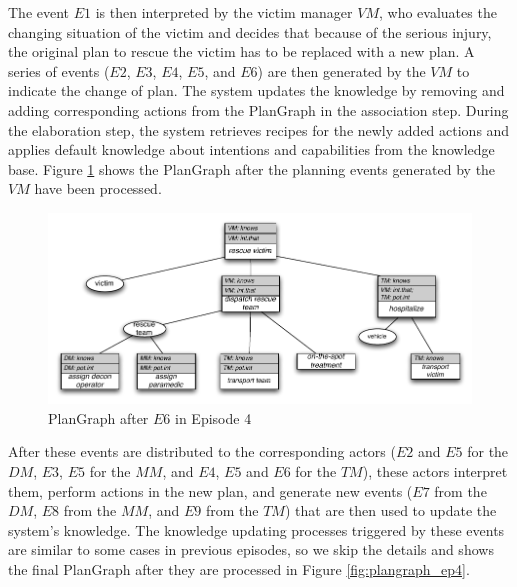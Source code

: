 The event $E1$ is then interpreted by the victim manager $VM$, who evaluates the changing situation of the victim and decides that because of the serious injury, the original plan to rescue the victim has to be replaced with a new plan. A series of events ($E2$, $E3$, $E4$, $E5$, and $E6$) are then generated by the $VM$ to indicate the change of plan. The system updates the knowledge by removing and adding corresponding actions from the PlanGraph in the association step. During the elaboration step, the system retrieves recipes for the newly added actions and applies default knowledge about intentions and capabilities from the knowledge base. Figure \ref{fig:plangraph_ep4_e6} shows the PlanGraph after the planning events generated by the $VM$ have been processed.

\begin{figure}[htbp] %
	\centering
	\includegraphics{plangraph_ep4_e6.pdf} 
	\caption{PlanGraph after $E6$ in Episode 4}
	\label{fig:plangraph_ep4_e6}
\end{figure}

After these events are distributed to the corresponding actors ($E2$ and $E5$ for the $DM$, $E3$, $E5$ for the $MM$, and $E4$, $E5$ and $E6$ for the $TM$), these actors interpret them, perform actions in the new plan, and generate new events ($E7$ from the $DM$, $E8$ from the $MM$, and $E9$ from the $TM$) that are then used to update the system's knowledge. The knowledge updating processes triggered by these events are similar to some cases in previous episodes, so we skip the details and shows the final PlanGraph after they are processed in Figure \ref{fig:plangraph_ep4}.

